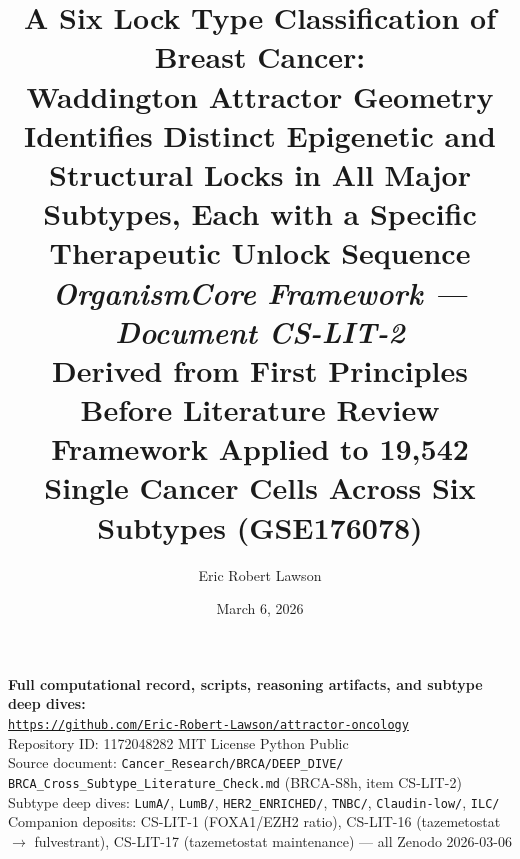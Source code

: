 \documentclass[12pt, a4paper]{article}
\title{
    \vspace{-1em}
    \textbf{A Six Lock Type Classification of Breast
    Cancer:}\\[0.5em]
    \large Waddington Attractor Geometry Identifies
    Distinct Epigenetic and Structural Locks in All
    Major Subtypes, Each with a Specific Therapeutic
    Unlock Sequence\\[0.4em]
    \normalsize \textit{OrganismCore Framework ---
    Document CS-LIT-2}\\[0.3em]
    \small Derived from First Principles Before
    Literature Review\\[0.3em]
    \small Framework Applied to 19,542 Single Cancer
    Cells Across Six Subtypes (GSE176078)
}
\author[1]{Eric Robert Lawson}
\affil[1]{
    OrganismCore\\
    \href{mailto:OrganismCore@proton.me}
         {OrganismCore@proton.me}\\
    ORCID:
    \href{https://orcid.org/0009-0002-0414-6544}
         {0009-0002-0414-6544}
}
\date{March 6, 2026}
\begin{document}

\maketitle
\thispagestyle{fancy}

\begin{center}
\colorbox{repobox}{
\begin{minipage}{0.88\textwidth}
\vspace{0.4em}
\centering
\textbf{Full computational record, scripts, reasoning
artifacts, and subtype deep dives:}\\[0.3em]
\href{https://github.com/Eric-Robert-Lawson/attractor-oncology}
{\texttt{https://github.com/Eric-Robert-Lawson/attractor-oncology}}
\\[0.2em]
\small
Repository ID: 1172048282 \textbar{}
MIT License \textbar{}
Python \textbar{}
Public\\[0.2em]
Source document: \texttt{Cancer\_Research/BRCA/DEEP\_DIVE/}
\texttt{BRCA\_Cross\_Subtype\_Literature\_Check.md}
(BRCA-S8h, item CS-LIT-2)\\[0.2em]
Subtype deep dives: \texttt{LumA/}, \texttt{LumB/},
\texttt{HER2\_ENRICHED/}, \texttt{TNBC/},
\texttt{Claudin-low/}, \texttt{ILC/}\\[0.2em]
Companion deposits: CS-LIT-1 (FOXA1/EZH2 ratio),
CS-LIT-16 (tazemetostat $\rightarrow$ fulvestrant),
CS-LIT-17 (tazemetostat maintenance)
--- all Zenodo 2026-03-06
\vspace{0.4em}
\end{minipage}
}
\end{center}

\vspace{0.8em}
\end{document}
